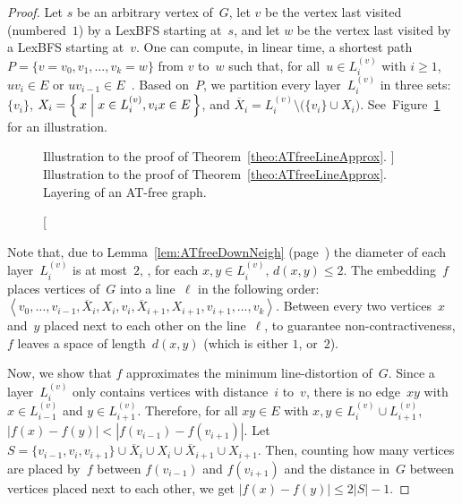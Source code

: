 \begin{proof}
Let $s$ be an arbitrary vertex of~$G$, let $v$ be the vertex last visited (numbered~$1$) by a LexBFS starting at~$s$, and let $w$ be the vertex last visited by a LexBFS starting at~$v$.
One can compute, in linear time, a shortest path~$P = \{ v = v_0, v_1, \ldots, v_k = w \}$ from $v$ to~$w$ such that, for all~$u \in L_i^{(v)}$ with $i \geq 1$, $uv_i \in E$ or $uv_{i-1} \in E$~\cite{KlokKratMuel1999}.
Based on~$P$, we partition every layer~$L_i^{(v)}$ in three sets: $\{ v_i \}$, $X_i = \left \{ \, x \Bigm| x \in L_i^{(v)}, v_ix \in E \, \right \}$, and $\overline{X}_i = L_i^{(v)} \setminus \big( \{ v_i \} \cup X_i \big)$.
See~Figure~\ref{fig:ATfreeLineApprox} for an illustration.

\begin{figure}
    [htb]
    \centering
    
    \caption
    [%
        Illustration to the proof of Theorem~\ref{theo:ATfreeLineApprox}.
    ]
    {%
        Illustration to the proof of Theorem~\ref{theo:ATfreeLineApprox}.
        Layering of an AT-free graph.
    } %
    \label{fig:ATfreeLineApprox}
\end{figure}

Note that, due to Lemma~\ref{lem:ATfreeDownNeigh} (page~\pageref{lem:ATfreeDownNeigh}) the diameter of each layer~$L_i^{(v)}$ is at most~$2$, \ie, for each $x, y \in L_i^{(v)}$, $d(x, y) \leq 2$.
The embedding~$f$ places vertices of~$G$ into a line~$\ell$ in the following order: $\left \langle v_0, \ldots, v_{i-1}, \overline{X}_{i}, X_{i}, v_i, \overline{X}_{i + 1}, X_{i + 1}, v_{i+1}, \ldots, v_k \right \rangle$.
Between every two vertices~$x$ and~$y$ placed next to each other on the line~$\ell$, to guarantee non-contractiveness, $f$ leaves a space of length~$d(x, y)$ (which is either $1$, or~$2$).

Now, we show that $f$ approximates the minimum line-distortion of~$G$.
Since a layer~$L_i^{(v)}$ only contains vertices with distance~$i$ to~$v$, there is no edge~$xy$ with $x \in L_{i-1}^{(v)}$ and $y \in L_{i+1}^{(v)}$.
Therefore, for all $xy \in E$ with $x, y \in L_i^{(v)} \cup L_{i + 1}^{(v)}$, $|f(x) - f(y)| < |f(v_{i - 1}) - f(v_{i + 1})|$.
Let $S = \{ v_{i - 1}, v_i, v_{i + 1} \} \cup \overline{X}_{i} \cup X_{i} \cup \overline{X}_{i + 1} \cup X_{i + 1}$.
Then, counting how many vertices are placed by~$f$ between $f(v_{i - 1})$ and $f(v_{i + 1})$ and the distance in~$G$ between vertices placed next to each other, we get $|f(x) - f(y)| \leq 2 |S| - 1$.


\end{proof}
